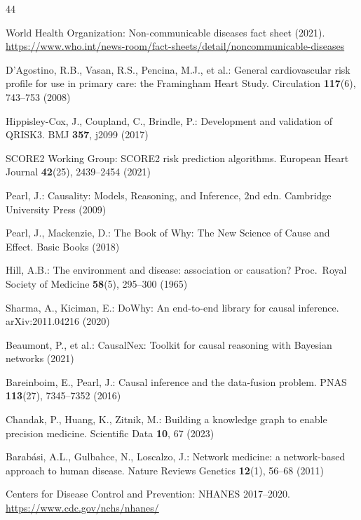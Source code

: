 \documentclass[runningheads]{llncs}
\begin{document}
\begin{thebibliography}{44}

World Health Organization:
Non-communicable diseases fact sheet (2021).
\url{https://www.who.int/news-room/fact-sheets/detail/noncommunicable-diseases}

D'Agostino, R.B., Vasan, R.S., Pencina, M.J., et al.:
General cardiovascular risk profile for use in primary care:
the Framingham Heart Study.
Circulation \textbf{117}(6), 743--753 (2008)

Hippisley-Cox, J., Coupland, C., Brindle, P.:
Development and validation of QRISK3.
BMJ \textbf{357}, j2099 (2017)

SCORE2 Working Group:
SCORE2 risk prediction algorithms.
European Heart Journal \textbf{42}(25), 2439--2454 (2021)

Pearl, J.:
Causality: Models, Reasoning, and Inference, 2nd edn.
Cambridge University Press (2009)

Pearl, J., Mackenzie, D.:
The Book of Why: The New Science of Cause and Effect.
Basic Books (2018)

Hill, A.B.:
The environment and disease: association or causation?
Proc.\ Royal Society of Medicine \textbf{58}(5), 295--300 (1965)

Sharma, A., Kiciman, E.:
DoWhy: An end-to-end library for causal inference.
arXiv:2011.04216 (2020)

Beaumont, P., et al.:
CausalNex: Toolkit for causal reasoning with Bayesian networks (2021)

Bareinboim, E., Pearl, J.:
Causal inference and the data-fusion problem.
PNAS \textbf{113}(27), 7345--7352 (2016)

Chandak, P., Huang, K., Zitnik, M.:
Building a knowledge graph to enable precision medicine.
Scientific Data \textbf{10}, 67 (2023)

Barab\'{a}si, A.L., Gulbahce, N., Loscalzo, J.:
Network medicine: a network-based approach to human disease.
Nature Reviews Genetics \textbf{12}(1), 56--68 (2011)

Centers for Disease Control and Prevention:
NHANES 2017--2020.
\url{https://www.cdc.gov/nchs/nhanes/}


\end{thebibliography}
\end{document}
